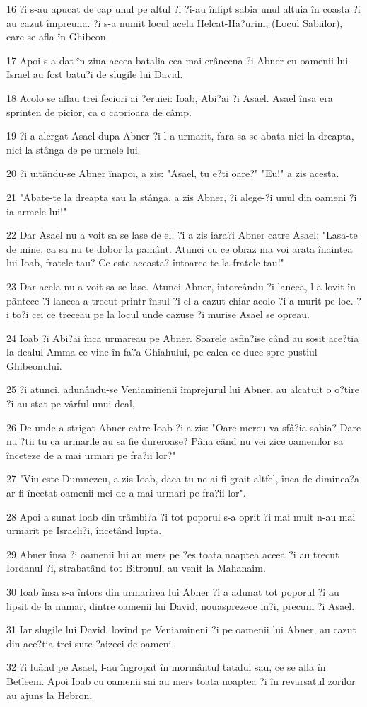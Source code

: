 \par 16 ?i s-au apucat de cap unul pe altul ?i ?i-au înfipt sabia unul altuia în coasta ?i au cazut împreuna. ?i s-a numit locul acela Helcat-Ha?urim, (Locul Sabiilor), care se afla în Ghibeon.
\par 17 Apoi s-a dat în ziua aceea batalia cea mai crâncena ?i Abner cu oamenii lui Israel au fost batu?i de slugile lui David.
\par 18 Acolo se aflau trei feciori ai ?eruiei: Ioab, Abi?ai ?i Asael. Asael însa era sprinten de picior, ca o caprioara de câmp.
\par 19 ?i a alergat Asael dupa Abner ?i l-a urmarit, fara sa se abata nici la dreapta, nici la stânga de pe urmele lui.
\par 20 ?i uitându-se Abner înapoi, a zis: "Asael, tu e?ti oare?" "Eu!" a zis acesta.
\par 21 "Abate-te la dreapta sau la stânga, a zis Abner, ?i alege-?i unul din oameni ?i ia armele lui!"
\par 22 Dar Asael nu a voit sa se lase de el. ?i a zis iara?i Abner catre Asael: "Lasa-te de mine, ca sa nu te dobor la pamânt. Atunci cu ce obraz ma voi arata înaintea lui Ioab, fratele tau? Ce este aceasta? întoarce-te la fratele tau!"
\par 23 Dar acela nu a voit sa se lase. Atunci Abner, întorcându-?i lancea, l-a lovit în pântece ?i lancea a trecut printr-însul ?i el a cazut chiar acolo ?i a murit pe loc. ?i to?i cei ce treceau pe la locul unde cazuse ?i murise Asael se opreau.
\par 24 Ioab ?i Abi?ai înca urmareau pe Abner. Soarele asfin?ise când au sosit ace?tia la dealul Amma ce vine în fa?a Ghiahului, pe calea ce duce spre pustiul Ghibeonului.
\par 25 ?i atunci, adunându-se Veniaminenii împrejurul lui Abner, au alcatuit o o?tire ?i au stat pe vârful unui deal,
\par 26 De unde a strigat Abner catre Ioab ?i a zis: "Oare mereu va sfâ?ia sabia? Dare nu ?tii tu ca urmarile au sa fie dureroase? Pâna când nu vei zice oamenilor sa înceteze de a mai urmari pe fra?ii lor?"
\par 27 "Viu este Dumnezeu, a zis Ioab, daca tu ne-ai fi grait altfel, înca de diminea?a ar fi încetat oamenii mei de a mai urmari pe fra?ii lor".
\par 28 Apoi a sunat Ioab din trâmbi?a ?i tot poporul s-a oprit ?i mai mult n-au mai urmarit pe Israeli?i, încetând lupta.
\par 29 Abner însa ?i oamenii lui au mers pe ?es toata noaptea aceea ?i au trecut Iordanul ?i, strabatând tot Bitronul, au venit la Mahanaim.
\par 30 Ioab însa s-a întors din urmarirea lui Abner ?i a adunat tot poporul ?i au lipsit de la numar, dintre oamenii lui David, nouasprezece in?i, precum ?i Asael.
\par 31 Iar slugile lui David, lovind pe Veniamineni ?i pe oamenii lui Abner, au cazut din ace?tia trei sute ?aizeci de oameni.
\par 32 ?i luând pe Asael, l-au îngropat în mormântul tatalui sau, ce se afla în Betleem. Apoi Ioab cu oamenii sai au mers toata noaptea ?i în revarsatul zorilor au ajuns la Hebron.

